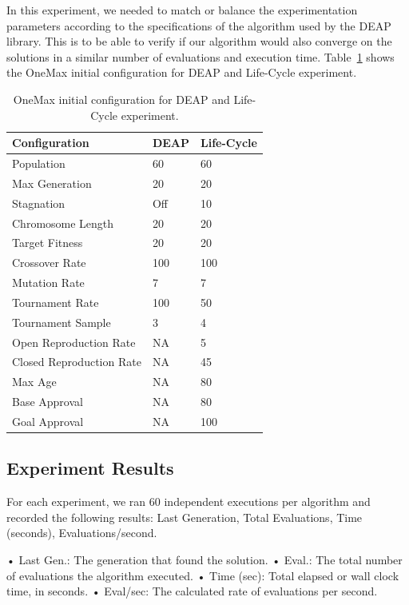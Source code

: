 \documentclass[runningheads]{llncs}
\begin{document}
In this experiment, we needed to match or balance the experimentation
parameters according to the specifications of the algorithm used by the DEAP
library. This is to be able to verify if our algorithm would also converge on
the solutions in a similar number of evaluations and execution time.
Table~\ref{tab1} shows the OneMax initial configuration for DEAP and Life-Cycle
experiment.

\begin{table}[]
    \centering        
    \caption{OneMax initial configuration for DEAP and Life-Cycle experiment.}\label{tab1}
    \begin{tabular}{|l|l|l|}
    \hline
    \textbf{Configuration} & \textbf{DEAP} & \textbf{Life-Cycle} \\ \hline
    Population & 60 & 60 \\ \hline
    Max Generation & 20 & 20 \\ \hline
    Stagnation & Off & 10 \\ \hline
    Chromosome Length & 20 & 20 \\ \hline
    Target Fitness & 20 & 20 \\ \hline
    Crossover Rate & 100 & 100 \\ \hline
    Mutation Rate & 7 & 7 \\ \hline
    Tournament Rate & 100 & 50 \\ \hline
    Tournament Sample & 3 & 4 \\ \hline
    Open Reproduction Rate & NA & 5 \\ \hline
    Closed Reproduction Rate & NA & 45 \\ \hline
    Max Age & NA & 80 \\ \hline
    Base Approval & NA & 80 \\ \hline
    Goal Approval & NA & 100 \\ \hline
    \end{tabular}
    \end{table}


\subsection{Experiment Results}

For each experiment, we ran 60 independent executions per algorithm and
recorded the following results: Last Generation, Total Evaluations, Time
(seconds), Evaluations/second.

•	Last Gen.: The generation that found the solution.
•	Eval.: The total number of evaluations the algorithm executed. 
•	Time (sec): Total elapsed or wall clock time, in seconds. 
•	Eval/sec: The calculated rate of evaluations per second.
\end{document}
